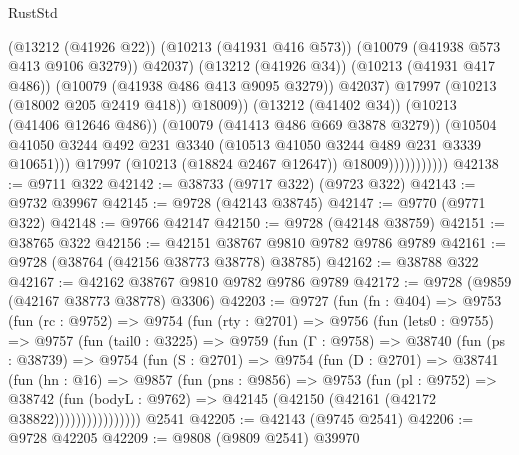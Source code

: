 \begin{lexlean}{RustStd}
\begin{coremodule}
                                    (@13212 (@41926 @22))
                                    (@10213 (@41931 @416 @573))
                                    (@10079 (@41938 @573 @413 @9106 @3279))
                                    @42037)
                                  (@13212 (@41926 @34))
                                  (@10213 (@41931 @417 @486))
                                  (@10079 (@41938 @486 @413 @9095 @3279))
                                  @42037)
                                @17997
                                (@10213 (@18002 @205 @2419 @418))
                                @18009))
                            (@13212 (@41402 @34))
                            (@10213 (@41406 @12646 @486))
                            (@10079 (@41413 @486 @669 @3878 @3279))
                            (@10504
                              @41050
                              @3244
                              @492
                              @231
                              @3340
                              (@10513 @41050 @3244 @489 @231 @3339 @10651)))
                          @17997
                          (@10213 (@18824 @2467 @12647))
                          @18009)))))))))))
@42138 := @9711 @322
@42142 := @38733 (@9717 @322) (@9723 @322)
@42143 := @9732 @39967
@42145 := @9728 (@42143 @38745)
@42147 := @9770 (@9771 @322)
@42148 := @9766 @42147
@42150 := @9728 (@42148 @38759)
@42151 := @38765 @322
@42156 := @42151 @38767 @9810 @9782 @9786 @9789
@42161 := @9728 (@38764 (@42156 @38773 @38778) @38785)
@42162 := @38788 @322
@42167 := @42162 @38767 @9810 @9782 @9786 @9789
@42172 := @9728 (@9859 (@42167 @38773 @38778) @3306)
@42203 := @9727
    (fun (fn : @404) =>
    @9753
      (fun (rc : @9752) =>
      @9754
        (fun (rty : @2701) =>
        @9756
          (fun (lets0 : @9755) =>
          @9757
            (fun (tail0 : @3225) =>
            @9759
              (fun (Γ : @9758) =>
              @38740
                (fun (ps : @38739) =>
                @9754
                  (fun (S : @2701) =>
                  @9754
                    (fun (D : @2701) =>
                    @38741
                      (fun (hn : @16) =>
                      @9857
                        (fun (pns : @9856) =>
                        @9753
                          (fun (pl : @9752) =>
                          @38742
                            (fun (bodyL : @9762) =>
                            @42145 (@42150 (@42161 (@42172 @38822))))))))))))))))
    @2541
@42205 := @42143 (@9745 @2541)
@42206 := @9728 @42205
@42209 := @9808 (@9809 @2541) @39970

\end{coremodule}
\end{lexlean}
